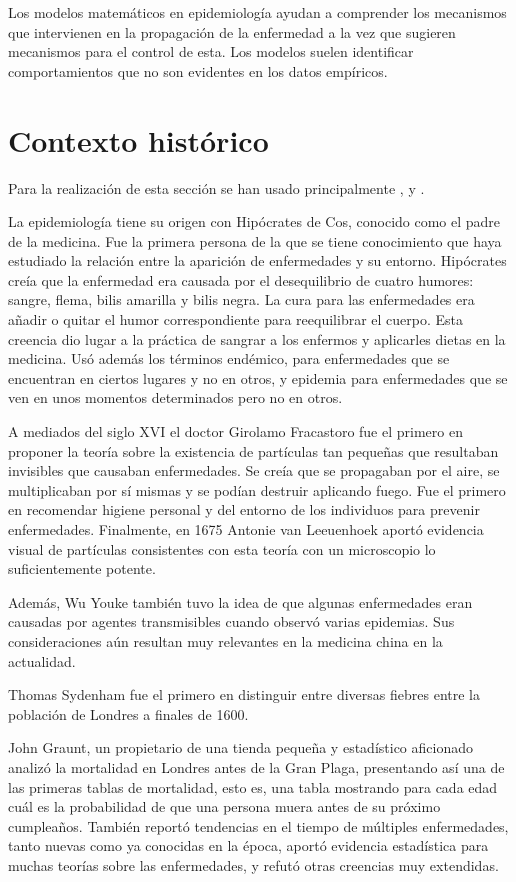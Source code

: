 Los modelos matemáticos en epidemiología ayudan a comprender los mecanismos que intervienen en la propagación de la enfermedad a la vez que sugieren mecanismos para el control de esta. Los modelos suelen identificar comportamientos que no son evidentes en los datos empíricos.


\section{Contexto histórico}

Para la realización de esta sección se han usado principalmente \cite{Byrne2012-ej}, \cite{Merril2010-nm} y \cite{Johnson2011-di}.

La epidemiología tiene su origen con Hipócrates de Cos, conocido como el padre de la medicina. Fue la primera persona de la que se tiene conocimiento que haya estudiado la relación entre la aparición de enfermedades y su entorno. Hipócrates creía que la enfermedad era causada por el desequilibrio de cuatro humores: sangre, flema, bilis amarilla y bilis negra. La cura para las enfermedades era añadir o quitar el humor correspondiente para reequilibrar el cuerpo. Esta creencia dio lugar a la práctica de sangrar a los enfermos y aplicarles dietas en la medicina. Usó además los términos endémico, para enfermedades que se encuentran en ciertos lugares y no en otros, y epidemia para enfermedades que se ven en unos momentos determinados pero no en otros.

A mediados del siglo XVI el doctor Girolamo Fracastoro fue el primero en proponer la teoría sobre la existencia de partículas tan pequeñas que resultaban invisibles que causaban enfermedades. Se creía que se propagaban por el aire, se multiplicaban por sí mismas y se podían destruir aplicando fuego. Fue el primero en recomendar higiene personal y del entorno de los individuos para prevenir enfermedades. Finalmente, en 1675 Antonie van Leeuenhoek aportó evidencia visual de partículas consistentes con esta teoría con un microscopio lo suficientemente potente.

Además, Wu Youke también tuvo la idea de que algunas enfermedades eran causadas por agentes transmisibles cuando observó varias epidemias. Sus consideraciones aún resultan muy relevantes en la medicina china en la actualidad.

Thomas Sydenham fue el primero en distinguir entre diversas fiebres entre la población de Londres a finales de 1600.

John Graunt, un propietario de una tienda pequeña y estadístico aficionado analizó la mortalidad en Londres antes de la Gran Plaga, presentando así una de las primeras tablas de mortalidad, esto es, una tabla mostrando para cada edad cuál es la probabilidad de que una persona muera antes de su próximo cumpleaños. También reportó tendencias en el tiempo de múltiples enfermedades, tanto nuevas como ya conocidas en la época, aportó evidencia estadística para muchas teorías sobre las enfermedades, y refutó otras creencias muy extendidas.

